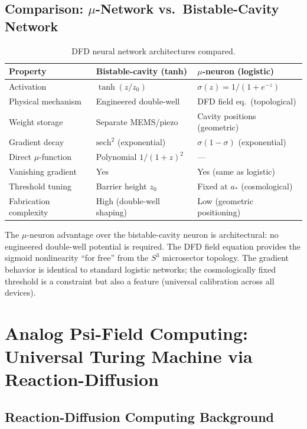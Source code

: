\documentclass[11pt]{article}
\theoremstyle{definition}
\theoremstyle{remark}
\newcommand{\astar}{a_*}
\begin{document}
\subsection{Comparison: $\mu$-Network vs.\ Bistable-Cavity Network}

\begin{table}[h]
\centering
\caption{DFD neural network architectures compared.}
\label{tab:nn_compare}
\begin{tabular}{@{}lll@{}}
\toprule
Property & Bistable-cavity (tanh) & $\mu$-neuron (logistic) \\
\midrule
Activation & $\tanh(z/z_0)$ & $\sigma(z) = 1/(1+e^{-z})$ \\
Physical mechanism & Engineered double-well & DFD field eq.\ (topological) \\
Weight storage & Separate MEMS/piezo & Cavity positions (geometric) \\
Gradient decay & $\mathrm{sech}^2$ (exponential) & $\sigma(1-\sigma)$ (exponential) \\
Direct $\mu$-function & Polynomial $1/(1+z)^2$ & --- \\
Vanishing gradient & Yes & Yes (same as logistic) \\
Threshold tuning & Barrier height $z_0$ & Fixed at $\astar$ (cosmological) \\
Fabrication complexity & High (double-well shaping) & Low (geometric positioning) \\
\bottomrule
\end{tabular}
\end{table}

The $\mu$-neuron advantage over the bistable-cavity neuron is architectural:
no engineered double-well potential is required. The DFD field equation
provides the sigmoid nonlinearity ``for free'' from the $S^3$ microsector
topology. The gradient behavior is identical to standard logistic networks;
the cosmologically fixed threshold is a constraint but also a feature
(universal calibration across all devices).

\section{Analog Psi-Field Computing: Universal Turing Machine via
Reaction-Diffusion}
\label{sec:turing_rda}

\subsection{Reaction-Diffusion Computing Background}
\end{document}
